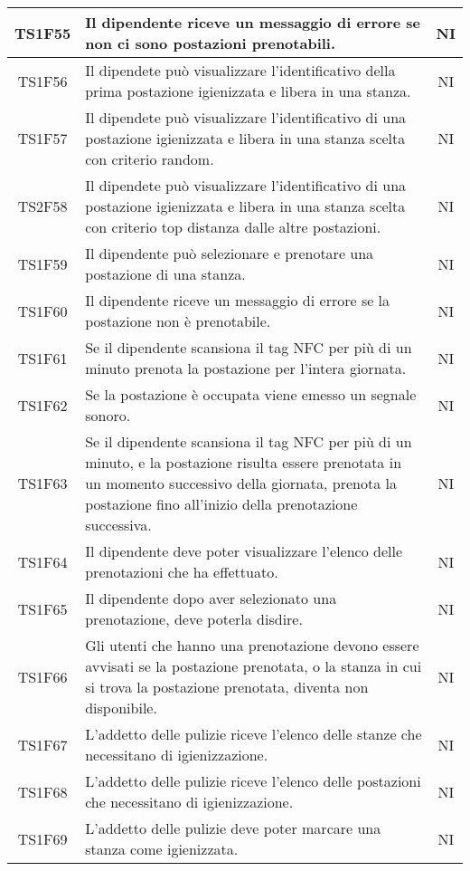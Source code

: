 \begin{center}
\begin{longtable}{|c|p{10cm}|c|}
			\hline
			TS1F55 & Il dipendente riceve un messaggio di errore se non ci sono postazioni prenotabili. & NI \\	
			\hline
			TS1F56 & Il dipendete può visualizzare l'identificativo della prima postazione igienizzata e libera in una stanza. & NI \\	
			\hline
			TS1F57 & Il dipendete può visualizzare l'identificativo di una postazione igienizzata e libera in una stanza scelta con criterio random. & NI \\	
			\hline
			TS2F58 & Il dipendete può visualizzare l'identificativo di una postazione igienizzata e libera in una stanza scelta con criterio top distanza dalle altre postazioni. & NI \\	
			\hline
			TS1F59 & Il dipendente può selezionare e prenotare una postazione di una stanza. & NI \\		
			\hline
			TS1F60 & Il dipendente riceve un messaggio di errore se la postazione non è prenotabile. & NI \\	
			\hline
			TS1F61 & Se il dipendente scansiona il tag NFC per più di un minuto prenota la postazione per l'intera giornata. & NI \\	
			\hline
			TS1F62 & Se la postazione è occupata viene emesso un segnale sonoro. & NI \\	
			\hline
			TS1F63 & Se il dipendente scansiona il tag NFC per più di un minuto, e la postazione risulta essere prenotata in un momento successivo della giornata, prenota la postazione fino all'inizio della prenotazione successiva. & NI \\	
			\hline
			TS1F64 & Il dipendente deve poter visualizzare l'elenco delle prenotazioni che ha effettuato. & NI \\
			\hline
			TS1F65 & Il dipendente dopo aver selezionato una prenotazione, deve poterla disdire. & NI \\	
			\hline
			TS1F66 & Gli utenti che hanno una prenotazione devono essere avvisati se la postazione prenotata, o la stanza in cui si trova la postazione prenotata, diventa non disponibile. & NI \\	
			\hline
			TS1F67 & L'addetto delle pulizie riceve l'elenco delle stanze che necessitano di igienizzazione. & NI \\	
			\hline
			TS1F68 & L'addetto delle pulizie riceve l'elenco delle postazioni che necessitano di igienizzazione. & NI \\	
			\hline
			TS1F69 & L'addetto delle pulizie deve poter marcare una stanza come igienizzata. & NI \\	

\end{longtable}
\end{center}
